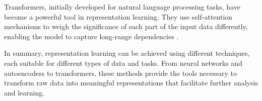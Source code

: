 Transformers, initially developed for natural language processing tasks, have become a powerful tool in representation learning. They use self-attention mechanisms to weigh the significance of each part of the input data differently, enabling the model to capture long-range dependencies .

In summary, representation learning can be achieved using different techniques, each suitable for different types of data and tasks. From neural networks and autoencoders to transformers, these methods provide the tools necessary to transform raw data into meaningful representations that facilitate further analysis and learning.
